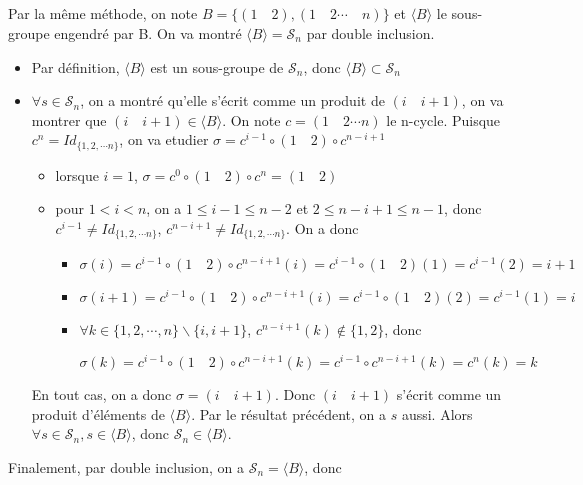 \documentclass[a4paper,12pt]{book}
\begin{document}
\subsection{}
Par la même méthode, on note $B=\{(1\quad 2),(1\quad 2\cdots\quad n)\}$ et $\langle B\rangle$ le sous-groupe engendré par B. On va montré $\langle B\rangle=\mathscr{S}_n$ par double inclusion. 
\begin{itemize}
    \item Par définition, $\langle B\rangle$ est un sous-groupe de $\mathscr{S}_n$, donc $\langle B\rangle \subset \mathscr{S}_n$
    \item $\forall s \in \mathscr{S}_n$, on a montré qu'elle s'écrit comme un produit de $(i\quad i+1)$, on va montrer que $(i\quad i+1) \in \langle B\rangle$.
    On note $c=(1\quad2\cdots n)$ le n-cycle. Puisque $c^n=Id_{\{1,2,\cdots n\}}$, on va etudier $\sigma=c^{i-1}\circ(1\quad 2)\circ c^{n-i+1}$
    \begin{itemize}
        \item lorsque $i=1$, $\sigma=c^0\circ (1 \quad 2)\circ c^n=(1 \quad 2)$
        \item pour $1<i<n$, on a $1\leq i-1\leq n-2$ et $2\leq n-i+1\leq n-1$, donc $c^{i-1}\neq Id_{\{1,2,\cdots n\}}$, $c^{n-i+1}\neq Id_{\{1,2,\cdots n\}}$. 
        On a donc 
        \begin{itemize}
            \item $\sigma(i)=c^{i-1}\circ(1\quad 2)\circ c^{n-i+1}(i)=c^{i-1}\circ(1\quad 2)(1)=c^{i-1}(2)=i+1$
            \item $\sigma(i+1)=c^{i-1}\circ(1\quad 2)\circ c^{n-i+1}(i)=c^{i-1}\circ(1\quad 2)(2)=c^{i-1}(1)=i$
            \item $\forall k\in\{1,2,\cdots,n\}\backslash\{i,i+1\}$, $c^{n-i+1}(k)\notin\{1,2\}$, donc 
            
            $\sigma(k)=c^{i-1}\circ(1\quad 2)\circ c^{n-i+1}(k)=c^{i-1}\circ c^{n-i+1}(k)=c^n(k)=k$
        \end{itemize}
    \end{itemize}
    En tout cas, on a donc $\sigma=(i\quad i+1)$. Donc $(i \quad i+1)$ s'écrit comme un produit d'éléments de $\langle B \rangle$. 
    Par le résultat précédent, on a $s$ aussi. Alors $\forall s \in \mathscr{S}_n, s \in \langle B \rangle$, donc $\mathscr{S}_n \in \langle B\rangle$.
\end{itemize}
Finalement, par double inclusion, on a $\mathscr{S}_n=\langle B\rangle$, donc 
\subsection{}
\end{document}
